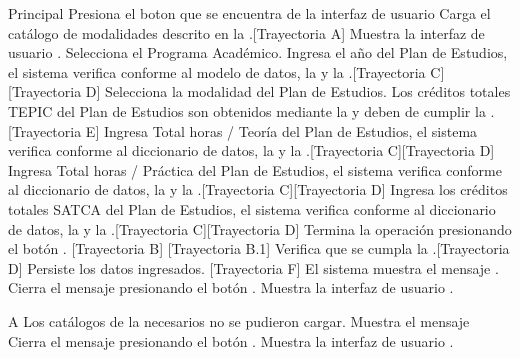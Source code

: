 \begin{UCtrayectoria}{Principal}
	\UCpaso[\UCactor] Presiona el boton \IUbutton{+} que se encuentra de la interfaz de usuario 
	\UCpaso Carga el catálogo de modalidades descrito en la .[Trayectoria A]
	\UCpaso Muestra la interfaz de usuario .
	\UCpaso[\UCactor] Selecciona el Programa Académico.
	\UCpaso[\UCactor] Ingresa el año del Plan de Estudios, el sistema verifica conforme al modelo de datos, la  y la .[Trayectoria C][Trayectoria D]
	\UCpaso[\UCactor] Selecciona la modalidad del Plan de Estudios.
	\UCpaso Los créditos totales TEPIC del Plan de Estudios son obtenidos mediante la  y deben de cumplir la .[Trayectoria E]
	\UCpaso[\UCactor] Ingresa Total horas / Teoría del Plan de Estudios, el sistema verifica conforme al diccionario de datos, la  y la .[Trayectoria C][Trayectoria D]
	\UCpaso[\UCactor] Ingresa Total horas / Práctica del Plan de Estudios, el sistema verifica conforme al diccionario de datos, la  y la .[Trayectoria C][Trayectoria D]
	\UCpaso[\UCactor] Ingresa los créditos totales SATCA del Plan de Estudios, el sistema verifica conforme al diccionario de datos, la  y la .[Trayectoria C][Trayectoria D]
	\UCpaso[\UCactor] Termina la operación presionando el botón . [Trayectoria B] [Trayectoria B.1]
    \UCpaso Verifica que se cumpla la .[Trayectoria D]
	\UCpaso Persiste los datos ingresados. [Trayectoria F]
	\UCpaso El sistema muestra el mensaje .
	\UCpaso[\UCactor] Cierra el mensaje presionando el botón .
	\UCpaso Muestra la interfaz de usuario .
\end{UCtrayectoria}
\begin{UCtrayectoriaA}{A}{ Los catálogos de la  necesarios no se pudieron cargar.}
	\UCpaso Muestra el mensaje 
	\UCpaso[\UCactor] Cierra el mensaje presionando el botón .
	\UCpaso Muestra la interfaz de usuario .
\end{UCtrayectoriaA}

